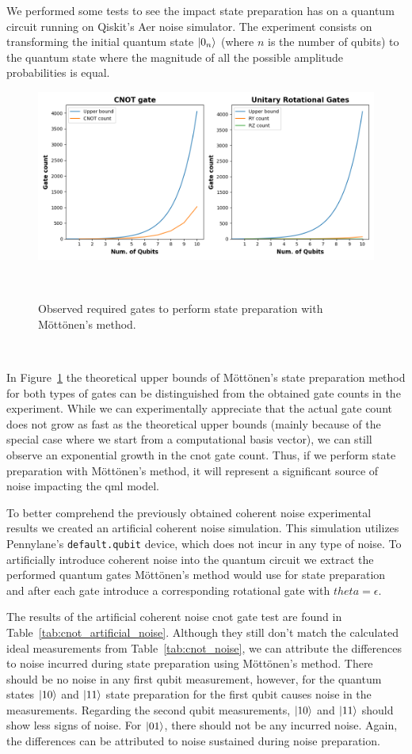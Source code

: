 We performed some tests to see the impact state preparation has on
a quantum circuit running on Qiskit's Aer noise simulator. The experiment
consists on transforming the initial quantum state \(\ket{0_{n}}\)
(where \(n\) is the number of qubits) to the quantum state where the
magnitude of all the possible amplitude probabilities is equal. \

\begin{figure}[h!]
  \includegraphics[scale=0.55]{figures/state-prep-gates-count.png}
  \centering
  \caption{Observed required gates to perform state preparation with Möttönen's method.}
~\label{fig:state_prep}
\end{figure} \

In Figure~\ref{fig:state_prep} the theoretical upper bounds of
Möttönen's state preparation method for both types of gates can
be distinguished from the obtained gate counts in the experiment.
While we can experimentally appreciate that the actual gate count
does not grow as fast as the theoretical upper bounds (mainly because
of the special case where we start from a computational basis vector),
we can still observe an exponential growth in the \ac{cnot} gate count.
Thus, if we perform state preparation with Möttönen's method, it will
represent a significant source of noise impacting the \ac{qml} model. \

To better comprehend the previously obtained coherent noise experimental
results we created an artificial coherent noise simulation. This
simulation utilizes Pennylane's \colorbox{inline_gray}{\lstinline|default.qubit|}
device, which does not incur in any type of noise. To artificially
introduce coherent noise into the quantum circuit we extract the
performed quantum gates Möttönen's method would use for state
preparation and after each gate introduce a corresponding rotational
gate with \(theta = \epsilon\). \

The results of the artificial coherent noise \ac{cnot} gate test are found
in Table~\ref{tab:cnot_artificial_noise}. Although they still don't
match the calculated ideal measurements from Table~\ref{tab:cnot_noise},
we can attribute the differences to noise incurred during state preparation
using Möttönen's method. There should be no noise in any first qubit
measurement, however, for the quantum states \(\ket{10}\) and \(\ket{11}\)
state preparation for the first qubit causes noise in the measurements.
Regarding the second qubit measurements, \(\ket{10}\) and \(\ket{11}\)
should show less signs of noise. For \(\ket{01}\), there should not be
any incurred noise. Again, the differences can be attributed to noise
sustained during noise preparation. \

